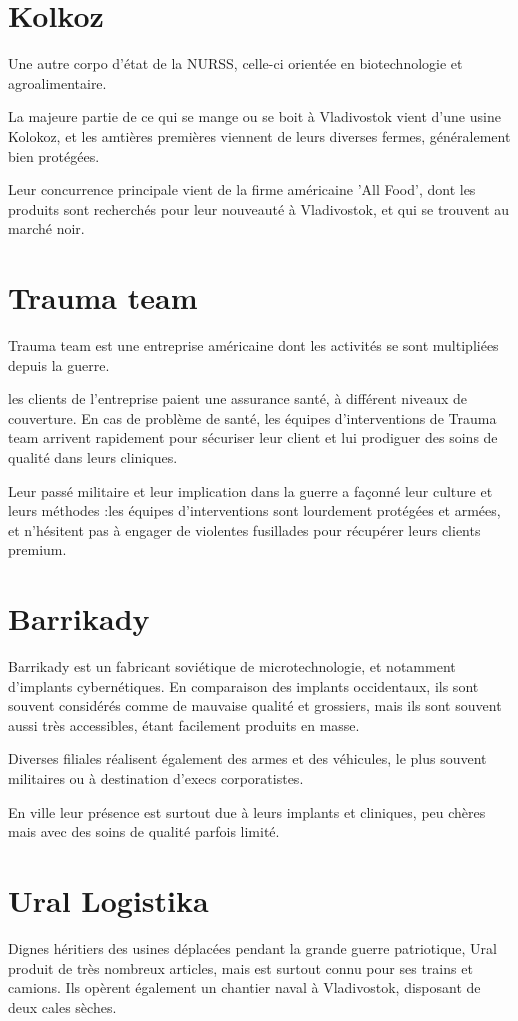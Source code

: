 \documentclass[10pt,a4paper]{book}
\begin{document}
\section{Kolkoz}
Une autre corpo d'état de la NURSS, celle-ci orientée en biotechnologie et agroalimentaire.

La majeure partie de ce qui se mange ou se boit à Vladivostok vient d'une usine Kolokoz, et les amtières premières viennent de leurs diverses fermes, généralement bien protégées.

Leur concurrence principale vient de la firme américaine 'All Food', dont les produits sont recherchés pour leur nouveauté à Vladivostok, et qui se trouvent au marché noir.
\section{Trauma team}
Trauma team est une entreprise américaine dont les activités se sont multipliées depuis la guerre.

les clients de l'entreprise paient une assurance santé, à différent niveaux de couverture. En cas de problème de santé, les équipes d'interventions de Trauma team arrivent rapidement pour sécuriser leur client et lui prodiguer des soins de qualité dans leurs cliniques.

Leur passé militaire et leur implication dans la guerre a façonné leur culture et leurs méthodes :les équipes d'interventions sont lourdement protégées et armées, et n'hésitent pas à engager de violentes fusillades pour récupérer leurs clients premium.
\section{Barrikady}
Barrikady est un fabricant soviétique de microtechnologie, et notamment d'implants cybernétiques. En comparaison des implants occidentaux, ils sont souvent considérés comme de mauvaise qualité et grossiers, mais ils sont souvent aussi très accessibles, étant facilement produits en masse.

Diverses filiales réalisent également des armes et des véhicules, le plus souvent militaires ou à destination d'execs corporatistes.

En ville leur présence est surtout due à leurs implants et cliniques, peu chères mais avec des soins de qualité parfois limité.

\section{Ural Logistika}
Dignes héritiers des usines déplacées pendant la grande guerre patriotique, Ural produit de très nombreux articles, mais est surtout connu pour ses trains et camions. Ils opèrent également un chantier naval à Vladivostok, disposant de deux cales sèches.
\end{document}
